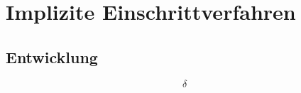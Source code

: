 \chapter{Implizite Einschrittverfahren}

\section{Entwicklung}

\begin{equation}
	\delta 
\end{equation}

